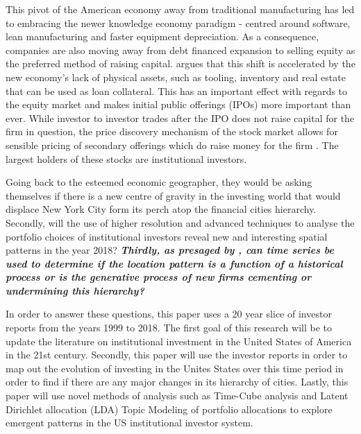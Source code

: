This pivot of the American economy away from traditional manufacturing has led to embracing the newer knowledge economy paradigm - centred around software, lean manufacturing and faster equipment depreciation.  As a consequence, companies are also moving away from debt financed expansion to selling equity as the preferred method of raising capital. 	\cite{Graves2003} argues that this shift is accelerated by the new economy's lack of physical assets, such as tooling, inventory and real estate that can be used as loan collateral. This has an important effect with regards to the equity market and makes initial public offerings (IPOs) more important than ever. While investor to investor trades after the IPO does not raise capital for the firm in question, the price discovery mechanism of the stock market allows for sensible pricing of secondary offerings which do raise money for the firm \citep{Tobin1969}. The largest holders of these stocks are institutional investors.

Going back to the esteemed economic geographer, they would be asking themselves if there is a new centre of gravity in the investing world that would displace New York City form its perch atop the financial cities hierarchy.  Secondly, will the use of higher resolution and advanced techniques to analyse the portfolio choices of institutional investors reveal new and interesting spatial patterns in the year 2018?  \textbf{\textit{Thirdly, as presaged by \cite{GreenOLef2014}, can time series be used to determine if the location pattern is a function of a historical process or is the generative process of new firms cementing or undermining this hierarchy?}}

In order to answer these questions, this paper uses a 20 year slice of investor reports from the years 1999 to 2018.  The first goal of this research will be to update the literature on institutional investment in the United States of America in the 21st century.  Secondly, this paper will use the investor reports in order to map out the evolution of investing in the Unites States over this time period in order to find if there are any major changes in its hierarchy of cities.  Lastly, this paper will use novel methods of analysis such as Time-Cube analysis and Latent Dirichlet allocation (LDA) Topic Modeling of portfolio allocations to explore emergent patterns in the US institutional investor system.  